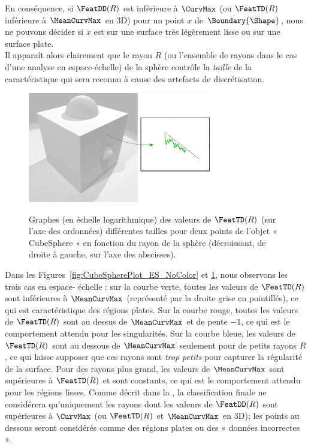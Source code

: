 %
En conséquence, si $\FeatDD(R)$ est inférieure à $\CurvMax$ (ou $\FeatTD(R)$
inférieure à $\MeanCurvMax$ en 3D) pour un point $x$ de $\Boundary{\Shape}$,
nous ne pouvons décider si $x$ est sur une surface très légèrement lisse ou sur
une surface plate.
%
\\
%
Il apparaît alors clairement que le rayon $R$ (ou l'ensemble de rayons dans le
cas d'une analyse en espace-échelle) de la sphère contrôle la \emph{taille} de
la caractéristique qui sera reconnu à cause des artefacts de discrétisation.
%
\begin{figure}[ht]
\begin{center}
  {\includegraphics[width=8cm]{figures/CubeSpherePlot_F_NoColor}}
  \caption{Graphes (en échelle logarithmique) des valeurs de $\FeatTD(R)$ (sur
  l'axe des ordonnées) différentes tailles pour deux points de l'objet «
  CubeSphere » en fonction du rayon de la sphère (décroissant, de droite
  à gauche, sur l'axe des abscisses).\label{fig:CubeSpherePlot_F_NoColor}}
\end{center}
\end{figure}
%
Dans les Figures~\ref{fig:CubeSpherePlot_ES_NoColor} et
\ref{fig:CubeSpherePlot_F_NoColor}, nous observons les trois cas en espace-
échelle : sur la courbe verte, toutes les valeurs de $\FeatTD(R)$ sont
inférieures à $\MeanCurvMax$ (représenté par la droite grise en pointillés), ce
qui est caractéristique des régions plates. Sur la courbe rouge, toutes les
valeurs de $\FeatTD(R)$ sont au dessus de $\MeanCurvMax$ et de pente $-1$, ce
qui est le comportement attendu pour les singularités. Sur la courbe bleue, les
valeurs de $\FeatTD(R)$ sont au dessous de $\MeanCurvMax$ seulement pour de
petits rayons $R$, ce qui laisse supposer que ces rayons sont \emph{trop petits}
pour capturer la régularité de la surface. Pour des rayons plus grand, les
valeurs de $\MeanCurvMax$ sont supérieures à $\FeatTD(R)$ et sont constants, ce
qui est le comportement attendu pour les régions lisses. Comme décrit dans la
, la classification
finale ne considérera qu'uniquement les rayons dont les valeurs de $\FeatDD(R)$
sont supérieures à $\CurvMax$ (ou $\FeatTD(R)$ et $\MeanCurvMax$ en 3D); les
points au dessous seront considérés comme des régions plates ou des « données
incorrectes ».
%
